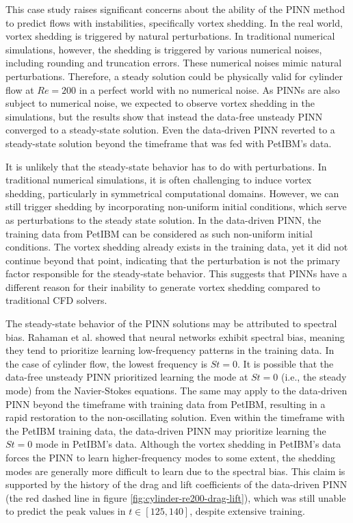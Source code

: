 
This case study raises significant concerns about the ability of the PINN method to predict flows with instabilities, specifically vortex shedding.
In the real world, vortex shedding is triggered by natural perturbations.
In traditional numerical simulations, however, the shedding is triggered by various numerical noises, including rounding and truncation errors.
These numerical noises mimic natural perturbations.
Therefore, a steady solution could be physically valid for cylinder flow at $Re = 200$ in a perfect world with no numerical noise.
As PINNs are also subject to numerical noise, we expected to observe vortex shedding in the simulations, but the results show that instead the data-free unsteady PINN converged to a steady-state solution.
Even the data-driven PINN reverted to a steady-state solution beyond the timeframe that was fed with PetIBM's data.

It is unlikely that the steady-state behavior has to do with perturbations.
In traditional numerical simulations, it is often challenging to induce vortex shedding, particularly in symmetrical computational domains.
However, we can still trigger shedding by incorporating non-uniform initial conditions, which serve as perturbations to the steady state solution.
In the data-driven PINN, the training data from PetIBM can be considered as such non-uniform initial conditions.
The vortex shedding already exists in the training data, yet it did not continue beyond that point, indicating that the perturbation is not the primary factor responsible for the steady-state behavior.
This suggests that PINNs have a different reason for their inability to generate vortex shedding compared to traditional CFD solvers.

The steady-state behavior of the PINN solutions may be attributed to spectral bias.
Rahaman et al. \cite{rahaman_spectral_2019} showed that neural networks exhibit spectral bias, meaning they tend to prioritize learning low-frequency patterns in the training data.
In the case of cylinder flow, the lowest frequency is $St=0$.
It is possible that the data-free unsteady PINN prioritized learning the mode at $St=0$ (i.e., the steady mode) from the Navier-Stokes equations.
The same may apply to the data-driven PINN beyond the timeframe with training data from PetIBM, resulting in a rapid restoration to the non-oscillating solution.
Even within the timeframe with the PetIBM training data, the data-driven PINN may prioritize learning the $St=0$ mode in PetIBM's data.
Although the vortex shedding in PetIBM's data forces the PINN to learn higher-frequency modes to some extent, the shedding modes are generally more difficult to learn due to the spectral bias.
This claim is supported by the history of the drag and lift coefficients of the data-driven PINN (the red dashed line in figure \ref{fig:cylinder-re200-drag-lift}), which was still unable to predict the peak values in $t \in \left[125, 140\right]$, despite extensive training.

